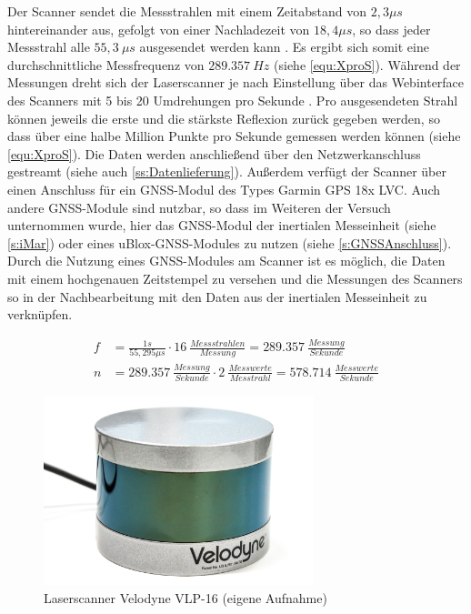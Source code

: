 \documentclass[a4paper,12pt,bibliography=totoc, listof=totoc,titlepage,pointlessnumbers]{scrreprt}
\begin{document}
Der Scanner sendet die Messstrahlen mit einem Zeitabstand von \(2,3\mu s\) hintereinander aus, gefolgt von einer Nachladezeit von \(18,4\mu s\), so dass jeder Messstrahl alle \(55,3~\mu s\) ausgesendet werden kann \citep[S. 16]{vlpManual}. Es ergibt sich somit eine durchschnittliche Messfrequenz von \(289.357~Hz\) (siehe \autoref{equ:XproS}). Während der Messungen dreht sich der Laser\-scan\-ner je nach Einstellung über das Webinterface des Scanners mit 5 bis 20 Umdrehungen pro Sekunde \citep{vlpSheet}. Pro ausgesendeten Strahl können jeweils die erste und die stärkste Reflexion zurück gegeben werden, so dass über eine halbe Million Punkte pro Sekunde gemessen werden können (siehe \autoref{equ:XproS}). Die Daten werden anschließend über den Netzwerkanschluss gestreamt (siehe auch \autoref{ss:Datenlieferung}). Außerdem verfügt der Scanner über einen Anschluss für ein GNSS-Modul des Types Garmin GPS 18x LVC. Auch andere GNSS-Module sind nutzbar, so dass im Weiteren der Versuch unternommen wurde, hier das GNSS-Modul der inertialen Messeinheit (siehe \autoref{s:iMar}) oder eines uBlox-GNSS-Modules zu nutzen (siehe \autoref{s:GNSSAnschluss}). Durch die Nutzung eines GNSS-Modules am Scanner ist es möglich, die Daten mit einem hochgenauen Zeitstempel zu versehen und die Messungen des Scanners so in der Nachbearbeitung mit den Daten aus der inertialen Messeinheit zu verknüpfen.

\begin{equation}
 \label{equ:XproS}
 \begin{aligned}
  f &= \frac{1s}{55,295\mu s} \cdot 16~\frac{Messstrahlen}{Messung} = 289.357~\frac{Messung}{Sekunde} \\
  n &= 289.357~\frac{Messung}{Sekunde} \cdot 2~\frac{Messwerte}{Messtrahl} = 578.714~\frac{Messwerte}{Sekunde}
 \end{aligned}
\end{equation}

\begin{figure}
 \centering
 \includegraphics[width=0.7\textwidth]{./img/vlp16.jpg}
 \caption{Laser\-scan\-ner Velodyne VLP-16 (eigene Aufnahme)}
 \label{img:vlp16}
\end{figure}
\end{document}
